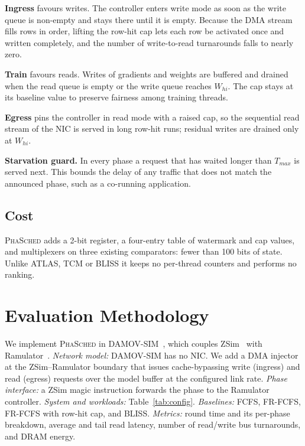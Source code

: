 \documentclass[conference]{IEEEtran}
\newcommand{\name}{\textsc{PhaSched}}
\begin{document}
\textbf{Ingress} favours writes. The controller enters write mode as soon as the write queue is non-empty and stays there until it is empty. Because the DMA stream fills rows in order, lifting the row-hit cap lets each row be activated once and written completely, and the number of write-to-read turnarounds falls to nearly zero.

\textbf{Train} favours reads. Writes of gradients and weights are buffered and drained when the read queue is empty or the write queue reaches $W_{hi}$. The cap stays at its baseline value to preserve fairness among training threads.

\textbf{Egress} pins the controller in read mode with a raised cap, so the sequential read stream of the NIC is served in long row-hit runs; residual writes are drained only at $W_{hi}$.

\textbf{Starvation guard.} In every phase a request that has waited longer than $T_{max}$ is served next. This bounds the delay of any traffic that does not match the announced phase, such as a co-running application.

\subsection{Cost}
\name{} adds a 2-bit register, a four-entry table of watermark and cap values, and multiplexers on three existing comparators: fewer than 100 bits of state. Unlike ATLAS, TCM or BLISS it keeps no per-thread counters and performs no ranking.

\section{Evaluation Methodology}
We implement \name{} in DAMOV-SIM~\cite{damov}, which couples ZSim~\cite{zsim} with Ramulator~\cite{ramulator}. \emph{Network model:} DAMOV-SIM has no NIC. We add a DMA injector at the ZSim--Ramulator boundary that issues cache-bypassing write (ingress) and read (egress) requests over the model buffer at the configured link rate. \emph{Phase interface:} a ZSim magic instruction forwards the phase to the Ramulator controller. \emph{System and workloads:} Table~\ref{tab:config}. \emph{Baselines:} FCFS, FR-FCFS, FR-FCFS with row-hit cap, and BLISS. \emph{Metrics:} round time and its per-phase breakdown, average and tail read latency, number of read/write bus turnarounds, and DRAM energy.
\end{document}
